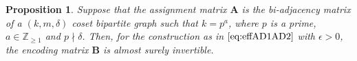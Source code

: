 \documentclass[journal,draftcls,onecolumn]{IEEEtran}
\theoremstyle{mystyle}
\newtheorem{prop}{Proposition}
\newtheorem{remark}{Remark}
\newcommand{\bfA}{\mathbf{A}}
\newcommand{\bfB}{\mathbf{B}}
\newcommand{\cF}{\mathcal{F}}
\begin{document}



\begin{prop}{\label{prop: cos_inv}}
Suppose that the assignment matrix $\bfA$ is the bi-adjacency matrix of a $(k, m, \delta)$ coset bipartite graph such that $k = p^a$, where $p$ is a prime, $a \in \mathbb{Z}_{\ge 1}$ and $p \nmid \delta$. Then, for the construction as in $\eqref{eq:effAD1AD2}$ with $\epsilon > 0$, the encoding matrix $\bfB$ is almost surely invertible. 
\end{prop}
\end{document}

